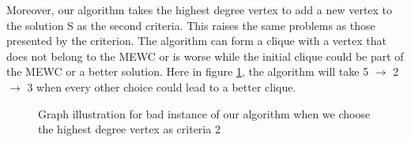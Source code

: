 Moreover, our algorithm takes the highest degree vertex to add a new vertex to the solution S as the second criteria. This raises the same problems as those presented by the criterion. The algorithm can form a clique with a vertex that does not belong to the MEWC or is worse while the initial clique could be part of the MEWC or a better solution. Here in figure \ref{fig:bad-instance-vertex-highest-degree2}, the algorithm will take 5 $\rightarrow$ 2 $\rightarrow$ 3 when every other choice could lead to a better clique. 

\begin{center}
    \begin{figure}[H]
        \centering
        \caption{Graph illustration for bad instance of our algorithm when we choose the highest degree vertex as criteria 2}
        \label{fig:bad-instance-vertex-highest-degree2}
    \end{figure}
\end{center}